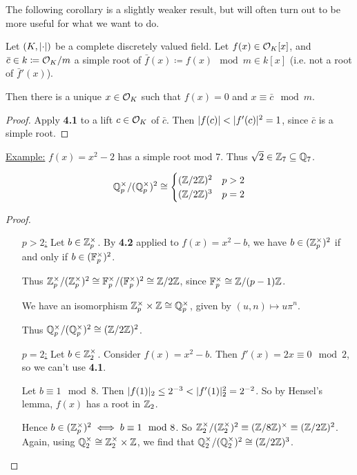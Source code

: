 \documentclass[10pt,a4paper]{article}
\begin{document}
The following corollary is a slightly weaker result, but will often turn out to be more useful for what we want to do.

\begin{corollary}
  Let $(K, \lvert\cdot\rvert)$ be a complete discretely valued field. Let $f(x)\in \mathcal{O}_K[x]$, and $\bar{c}\in k\coloneqq \mathcal{O}_K/m$ a simple root of $\bar{f}(x) \coloneqq f(x) \mod m \in k[x]$ (i.e. not a root of $\bar{f}'(x)$).

  Then there is a unique $x \in \mathcal{O}_K$ such that $f(x) = 0$ and $x \equiv \bar{c} \mod m$.
\end{corollary}
\begin{proof}
  Apply \textbf{4.1} to a lift $c \in \mathcal{O}_K$ of $\bar{c}$. Then $\lvert f(c)\rvert < \lvert f'(c)\rvert^2 = 1$, since $\bar{c}$ is a simple root.
\end{proof}

\underline{Example:} $f(x) = x^2-2$ has a simple root mod 7. Thus $\sqrt{2} \in \mathbb{Z}_7 \subseteq \mathbb{Q}_7$.

\begin{corollary}
  \[\mathbb{Q}_p^\times/(\mathbb{Q}_p^\times)^2 \cong \begin{cases} (\mathbb{Z}/2\mathbb{Z})^2 & p > 2 \\ (\mathbb{Z}/2\mathbb{Z})^3 & p=2 \end{cases}\]
\end{corollary}
\begin{proof}\hspace*{0cm}
  \begin{itemize}
    \item[\underline{$p>2$:}] Let $b \in \mathbb{Z}_p^\times$. By \textbf{4.2} applied to $f(x) = x^2-b$, we have $b \in (\mathbb{Z}_p^\times)^2$ if and only if $b \in (\mathbb{F}_p^\times)^2$.

    Thus $\mathbb{Z}_p^\times/(\mathbb{Z}_p^\times)^2 \cong \mathbb{F}_p^\times/(\mathbb{F}_p^\times)^2 \cong \mathbb{Z}/2\mathbb{Z}$, since $\mathbb{F}_p^\times \cong \mathbb{Z}/(p-1)\mathbb{Z}$.

    We have an isomorphism $ \mathbb{Z}_p^\times \times \mathbb{Z} \cong\mathbb{Q}_p^\times$, given by $(u, n) \mapsto u\pi^n$.

    Thus $\mathbb{Q}_p^\times/(\mathbb{Q}_p^\times)^2 \cong (\mathbb{Z}/2\mathbb{Z})^2$.

    \item[\underline{$p=2$:}] Let $b \in \mathbb{Z}_2^\times$. Consider $f(x) = x^2-b$. Then $f'(x) = 2x \equiv 0 \mod 2$, so we can't use \textbf{4.1}.

    Let $b \equiv 1 \mod 8$. Then $\lvert f(1)\rvert_2 \leq 2^{-3} < \lvert f'(1)\rvert_2^2 = 2^{-2}$. So by Hensel's lemma, $f(x)$ has a root in $\mathbb{Z}_2$.

    Hence $b \in (\mathbb{Z}_p^\times)^2 \iff b \equiv 1 \mod 8$. So $\mathbb{Z}_2^\times/(\mathbb{Z}_2^\times)^2 \equiv (\mathbb{Z}/8\mathbb{Z})^\times \equiv (\mathbb{Z}/2\mathbb{Z})^2$. Again, using $\mathbb{Q}_2^\times \cong \mathbb{Z}_2^\times \times \mathbb{Z}$, we find that $\mathbb{Q}_2^\times/(\mathbb{Q}_2^\times)^2 \cong (\mathbb{Z}/2\mathbb{Z})^3$.
  \end{itemize}
\end{proof}
\end{document}
